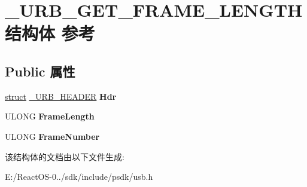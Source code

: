 \hypertarget{struct___u_r_b___g_e_t___f_r_a_m_e___l_e_n_g_t_h}{}\section{\+\_\+\+U\+R\+B\+\_\+\+G\+E\+T\+\_\+\+F\+R\+A\+M\+E\+\_\+\+L\+E\+N\+G\+T\+H结构体 参考}
\label{struct___u_r_b___g_e_t___f_r_a_m_e___l_e_n_g_t_h}
\subsection*{Public 属性}
\begin{DoxyCompactItemize}
\item 
\mbox{\label{struct___u_r_b___g_e_t___f_r_a_m_e___l_e_n_g_t_h_a482e4f0e7f5e15f0663a1095b30ac559}} 
\hyperlink{interfacestruct}{struct} \hyperlink{struct___u_r_b___h_e_a_d_e_r}{\+\_\+\+U\+R\+B\+\_\+\+H\+E\+A\+D\+ER} {\bfseries Hdr}
\item 
\mbox{\label{struct___u_r_b___g_e_t___f_r_a_m_e___l_e_n_g_t_h_a5a82f463d95f0d9809abb672ffa1c6a1}} 
U\+L\+O\+NG {\bfseries Frame\+Length}
\item 
\mbox{\label{struct___u_r_b___g_e_t___f_r_a_m_e___l_e_n_g_t_h_a4d5a32f753d7d9ebcfde9572fbf4454f}} 
U\+L\+O\+NG {\bfseries Frame\+Number}
\end{DoxyCompactItemize}


该结构体的文档由以下文件生成\+:\begin{DoxyCompactItemize}
\item 
E\+:/\+React\+O\+S-\/0../sdk/include/psdk/usb.\+h\end{DoxyCompactItemize}
